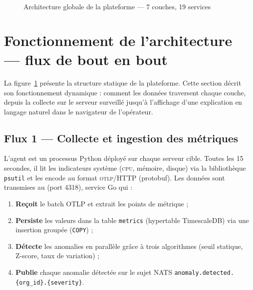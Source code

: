 \begin{landscape}
\begin{figure}[H]
{
}%
\caption{Architecture globale de la plateforme \caimp{} — 7 couches, 19 services}
\label{fig:arch-global}
\end{figure}
\end{landscape}

\section{Fonctionnement de l'architecture — flux de bout en bout}

La figure~\ref{fig:arch-global} présente la structure statique de la plateforme.
Cette section décrit son fonctionnement dynamique : comment les données traversent
chaque couche, depuis la collecte sur le serveur surveillé jusqu'à l'affichage
d'une explication en langage naturel dans le navigateur de l'opérateur.

\subsection{Flux 1 — Collecte et ingestion des métriques}

L'agent \caimp{} est un processus Python déployé sur chaque serveur cible.
Toutes les 15 secondes, il lit les indicateurs système (\textsc{cpu}, mémoire,
disque) via la bibliothèque \texttt{psutil} et les encode au format
\textsc{otlp}/HTTP (protobuf). Les données sont transmises au
 (port 4318), service Go qui :

\begin{enumerate}
  \item \textbf{Reçoit} le batch OTLP et extrait les points de métrique ;
  \item \textbf{Persiste} les valeurs dans la table \texttt{metrics}
        (hypertable TimescaleDB) via une insertion groupée (\texttt{COPY}) ;
  \item \textbf{Détecte} les anomalies en parallèle grâce à trois algorithmes
        (seuil statique, Z-score, taux de variation) ;
  \item \textbf{Publie} chaque anomalie détectée sur le sujet NATS
        \texttt{anomaly.detected.\{org\_id\}.\{severity\}}.
\end{enumerate}

